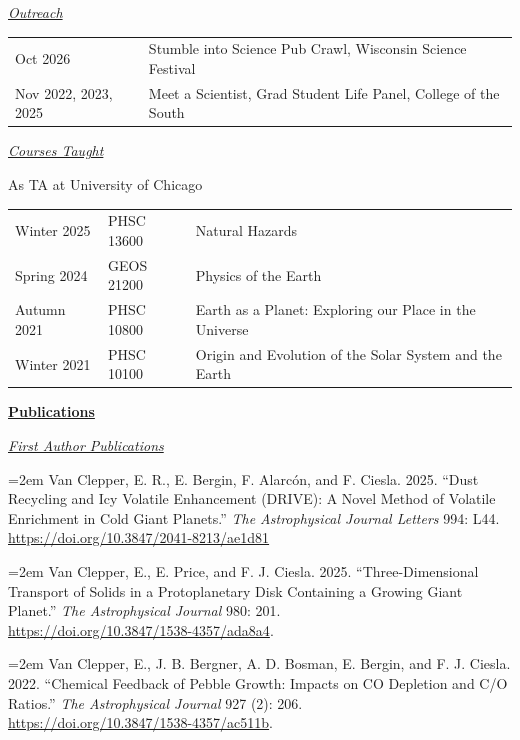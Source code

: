 \documentclass[11pt]{article}
\newcommand{\link}[1]{{\color{blue}\href{#1}{#1}}}
\begin{document}
\noindent\textit{\underline{Outreach}}

\noindent
\begin{tabular}{m{1.5in} m{4.5in}}
    Oct 2026            &Stumble into Science Pub Crawl, Wisconsin Science Festival\\
    Nov	2022, 2023, 2025 &Meet a Scientist, Grad Student Life Panel, College of the South
    \\
\end{tabular}

\noindent\textit{\underline{Courses Taught}}

\noindent As TA at University of Chicago

\noindent
\begin{tabular}{m{1.0in} m{1.0in} m{4.0in}}
    Winter 2025 & PHSC 13600 & Natural Hazards \\
    Spring 2024 & GEOS 21200 & Physics of the Earth \\
    Autumn 2021 & PHSC 10800 & Earth as a Planet: Exploring our Place in the Universe \\
    Winter 2021 & PHSC 10100 & Origin and Evolution of the Solar System and the Earth \\
\end{tabular}

\vspace{1em}
\noindent\textbf{\underline{Publications}}

\noindent\textit{\underline{First Author Publications}}


\noindent
\hangindent=2em
Van Clepper, E. R., E. Bergin, F. Alarc\'on, and F. Ciesla. 2025. ``Dust Recycling
and Icy Volatile Enhancement (DRIVE): A Novel Method of Volatile Enrichment in Cold
Giant Planets.'' \textit{The Astrophysical Journal Letters} 994: L44. 
\link{https://doi.org/10.3847/2041-8213/ae1d81}

\noindent
\hangindent=2em
Van Clepper, E., E. Price, and F. J. Ciesla. 2025. “Three-Dimensional
Transport of Solids in a Protoplanetary Disk Containing a Growing Giant Planet.”
\textit{The Astrophysical Journal} 980: 201. \\ 
\link{https://doi.org/10.3847/1538-4357/ada8a4}.

\noindent
\hangindent=2em
Van Clepper, E., J. B. Bergner, A. D. Bosman, E. Bergin, and F.
J. Ciesla. 2022. “Chemical Feedback of Pebble Growth: Impacts on CO Depletion
and C/O Ratios.” \textit{The Astrophysical Journal} 927 (2): 206. \\
\link{https://doi.org/10.3847/1538-4357/ac511b}.
\end{document}
